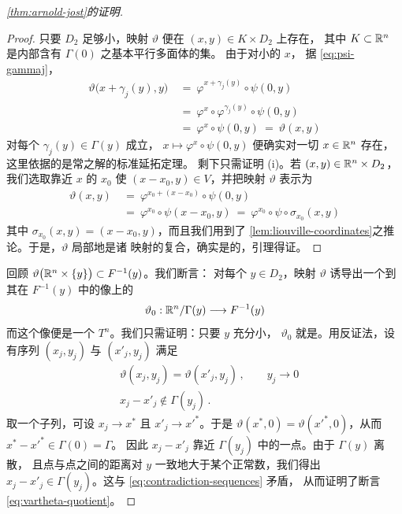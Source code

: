 \begin{proof}[\cref*{thm:arnold-jost}的证明]
\begin{proof}
只要 $D_{2}$ 足够小，映射 $\vartheta$ 便在 $(x,y)\in K\times D_{2}$ 上存在，%
其中 $K\subset\mathbb{R}^{n}$ 是内部含有 $\Gamma(0)$ 之基本平行多面体的\trCompact{}集。%
由于对小的 $x$，%
据 \eqref{eq:psi-gammaj}，
\begin{align*}
\vartheta\bigl(x+\gamma_{j}(y),y\bigr)\ &=\ \varphi^{x+\gamma_{j}(y)}\circ\psi(0,y)\\
&=\ \varphi^{x}\circ\varphi^{\gamma_{j}(y)}\circ\psi(0,y)\\
&=\ \varphi^{x}\circ\psi(0,y)\ =\ \vartheta(x,y)
\end{align*}
对每个 $\gamma_{j}(y)\in\Gamma(y)$ 成立，\trFlow{} $x\mapsto\varphi^{x}\circ\psi(0,y)$%
便确实对一切 $x\in\mathbb{R}^{n}$ 存在，这里依据的是常\trDifferentialEquation{}之解的标准延拓定理。%
剩下只需证明 (i)。若 $(x,y)\in\mathbb{R}^{n}\times D_{2}$，我们选取靠近 $x$ 的 $x_{0}$%
使 $(x-x_{0},y)\in V$，并把映射 $\vartheta$ 表示为
\begin{align*}
\vartheta(x,y)\ &=\ \varphi^{x_{0}+(x-x_{0})}\circ\psi(0,y)\\
&=\ \varphi^{x_{0}}\circ\psi(x-x_{0},y)\ =\ \varphi^{x_{0}}\circ\psi\circ\sigma_{x_{0}}(x,y)
\end{align*}
其中 $\sigma_{x_{0}}(x,y)=(x-x_{0},y)$，而且我们用到了%
\cref{lem:liouville-coordinates}之推论。于是，$\vartheta$ 局部地是诸%
\trSymplectic{}映射的复合，确实是\trSymplectic{}的，引理得证。
\end{proof}

回顾 $\vartheta\bigl(\mathbb{R}^{n}\times\{y\}\bigr)\subset F^{-1}(y)$。我们断言：%
对每个 $y\in D_{2}$，映射 $\vartheta$ 诱导出一个到其在 $F^{-1}(y)$ 中的像上的%
\trDiffeomorphism
\begin{equation}\label{eq:vartheta-quotient}
\vartheta_{0}:\mathbb{R}^{n}/\Gamma(y)\longrightarrow F^{-1}(y)
\end{equation}
而这个像便是一个\trTorus{} $T^{n}$。我们只需证明：只要 $y$ 充分小，%
$\vartheta_{0}$ 就是\trInjective。用反证法，设有序列 $(x_{j},y_{j})$ 与%
$(x'_{j},y_{j})$ 满足
\begin{equation}\label{eq:contradiction-sequences}
\begin{aligned}
&\vartheta(x_{j},y_{j})=\vartheta(x'_{j},y_{j})\,,\qquad y_{j}\to 0\\
&x_{j}-x'_{j}\notin\Gamma(y_{j})\,.
\end{aligned}
\end{equation}
取一个子列，可设 $x_{j}\to x^{*}$ 且 $x'_{j}\to x'^{*}$。于是%
$\vartheta(x^{*},0)=\vartheta(x'^{*},0)$，从而 $x^{*}-x'^{*}\in\Gamma(0)=\Gamma$。%
因此 $x_{j}-x'_{j}$ 靠近 $\Gamma(y_{j})$ 中的一点。由于 $\Gamma(y)$ 离散，%
且点与点之间的距离对 $y$ 一致地大于某个正常数，我们得出%
$x_{j}-x'_{j}\in\Gamma(y_{j})$。这与 \eqref{eq:contradiction-sequences} 矛盾，%
从而证明了断言 \eqref{eq:vartheta-quotient}。


\end{proof}
